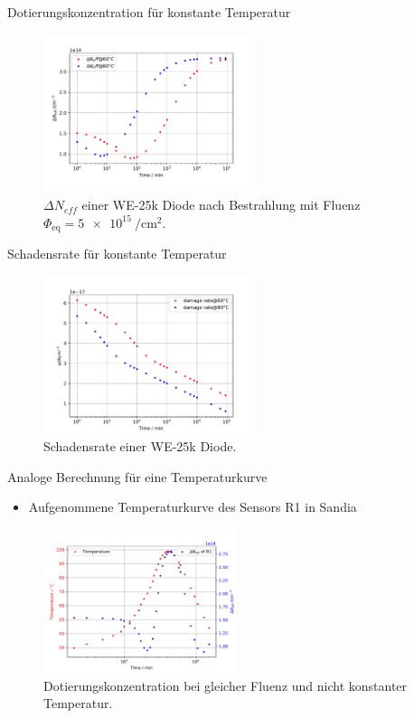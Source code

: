 \documentclass[aspectratio=1610, 9pt]{beamer}
\begin{document}
\begin{frame}{Dotierungskonzentration für konstante Temperatur}
  \begin{figure}
      \includegraphics[width=0.55\textwidth]{images/annealing.PDF}
  \caption{$\Delta N_{eff}$ einer WE-25k Diode nach Bestrahlung mit Fluenz $\Phi_{\mathrm{eq}} = \SI{5e15}{\per\centi\meter\squared}.$}
  \end{figure}
\end{frame}

\begin{frame}{Schadensrate für konstante Temperatur}
  \begin{figure}
      \includegraphics[width=0.55\textwidth]{images/damage.PDF}
  \caption{Schadensrate einer WE-25k Diode.}
  \end{figure}
\end{frame}


\begin{frame}{Analoge Berechnung für eine Temperaturkurve}
  \begin{itemize}
    \item Aufgenommene Temperaturkurve des Sensors R1 in Sandia
  \end{itemize}
  \begin{figure}
      \includegraphics[width=0.5\textwidth]{images/ohnekorrektur.PDF}
  \caption{Dotierungskonzentration bei gleicher Fluenz und nicht konstanter Temperatur.}
  \end{figure}
\end{frame}
\end{document}
